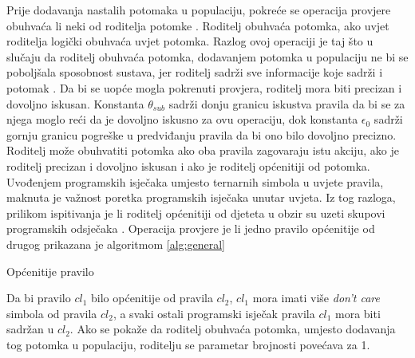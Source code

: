 \documentclass[times, utf8, zavrsni]{fer}
\begin{document}
Prije dodavanja nastalih potomaka u populaciju, pokreće se operacija provjere obuhvaća li neki od roditelja potomke .
Roditelj obuhvaća potomka, ako uvjet roditelja logički obuhvaća uvjet potomka.
Razlog ovoj operaciji je taj što u slučaju da roditelj obuhvaća potomka, dodavanjem potomka u populaciju ne bi se poboljšala sposobnost sustava, jer roditelj sadrži sve informacije koje sadrži i potomak \citep{1}.
Da bi se uopće mogla pokrenuti provjera, roditelj mora biti precizan i dovoljno iskusan.
Konstanta $\theta_{sub}$ sadrži donju granicu iskustva pravila da bi se za njega moglo reći da je dovoljno iskusno za ovu operaciju, dok konstanta $\epsilon_{0}$ sadrži gornju granicu pogreške u predviđanju pravila da bi ono bilo dovoljno precizno.
Roditelj može obuhvatiti potomka ako oba pravila zagovaraju istu akciju, ako je roditelj precizan i dovoljno iskusan i ako je roditelj općenitiji od potomka.
Uvođenjem programskih isječaka umjesto ternarnih simbola u uvjete pravila, maknuta je važnost poretka programskih isječaka unutar uvjeta.
Iz tog razloga, prilikom ispitivanja je li roditelj općenitiji od djeteta u obzir su uzeti skupovi programskih odsječaka \citep{4}.
Operacija provjere je li jedno pravilo općenitije od drugog prikazana je algoritmom \ref{alg:general}
\begin{algorithm}
    \caption{Općenitije pravilo}
    \label{alg:general}
    \begin{algorithmic}
        \ENDIF
        \ENDIF
    \end{algorithmic}
\end{algorithm}
Da bi pravilo $cl_{1}$ bilo općenitije od pravila $cl_{2}$, $cl_{1}$ mora imati više \emph{don't care} simbola od pravila $cl_{2}$, a svaki ostali programski isječak pravila $cl_{1}$ mora biti sadržan u $cl_{2}$.
Ako se pokaže da roditelj obuhvaća potomka, umjesto dodavanja tog potomka u populaciju, roditelju se parametar brojnosti povećava za 1.
\end{document}
